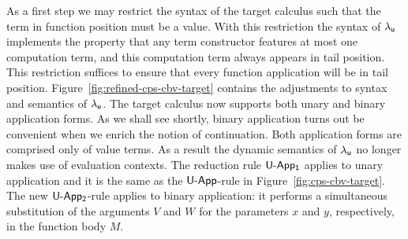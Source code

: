 \documentclass[12pt,phd,lfcs,twoside,openright,logo,leftchapter,normalheadings]{infthesis}
\theoremstyle{plain}
\theoremstyle{definition}
\begin{document}
As a first step we may restrict the syntax of the target calculus such
that the term in function position must be a value. With this
restriction the syntax of $\lambda_{\mathsf{u}}$ implements the property that any
term constructor features at most one computation term, and this
computation term always appears in tail position. This restriction
suffices to ensure that every function application will be in tail
position.
%
Figure~\ref{fig:refined-cps-cbv-target} contains the adjustments to
syntax and semantics of $\lambda_{\mathsf{u}}$. The target calculus now supports
both unary and binary application forms. As we shall see shortly,
binary application turns out be convenient when we enrich the notion
of continuation. Both application forms are comprised only of value
terms. As a result the dynamic semantics of $\lambda_{\mathsf{u}}$ no longer makes
use of evaluation contexts. The reduction rule $\mathsf{U\textrm{-}App_1}$
applies to unary application and it is the same as the
$\mathsf{U\textrm{-}App}$-rule in Figure~\ref{fig:cps-cbv-target}. The new
$\mathsf{U\textrm{-}App_2}$-rule applies to binary application: it performs a
simultaneous substitution of the arguments $V$ and $W$ for the
parameters $x$ and $y$, respectively, in the function body $M$.
%
\end{document}
